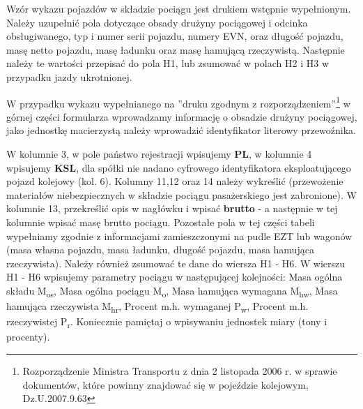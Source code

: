 Wzór wykazu pojazdów w składzie pociągu jest drukiem wstępnie wypełnionym. Należy uzupełnić pola dotyczące obsady drużyny pociągowej i odcinka obsługiwanego, typ i numer serii pojazdu, numery EVN, oraz długość pojazdu, masę netto pojazdu, masę ładunku oraz masę hamującą rzeczywistą. Następnie należy te wartości przepisać do pola H1, lub zsumować w polach H2 i H3 w przypadku jazdy ukrotnionej.

W przypadku wykazu wypełnianego na ''druku zgodnym z rozporządzeniem''\footnote{Rozporządzenie Ministra Transportu z dnia 2 listopada 2006 r. w sprawie dokumentów, które powinny znajdować się w pojeździe kolejowym, Dz.U.2007.9.63} w górnej części formularza wprowadzamy informację o obsadzie drużyny pociągowej, jako jednostkę macierzystą należy wprowadzić identyfikator literowy przewoźnika.

W kolumnie 3, w pole państwo rejestracji wpisujemy \textbf{PL}, w kolumnie 4 wpisujemy \textbf{KSL}, dla spółki nie nadano cyfrowego identyfikatora eksploatującego pojazd kolejowy (kol. 6). Kolumny 11,12 oraz 14 należy wykreślić (przewożenie materiałów niebezpiecznych w składzie pociągu pasażerskiego jest zabronione). W kolumnie 13, przekreślić opis w nagłówku i wpisać \textbf{brutto} - a następnie w tej kolumnie wpisać masę brutto pociągu. Pozostałe pola w tej części tabeli wypełniamy zgodnie z informacjami zamieszczonymi na pudle EZT lub wagonów (masa własna pojazdu, masa ładunku, długość pojazdu, masa hamująca rzeczywista). Należy również zsumować te dane do wiersza H1 - H6.
W wierszu H1 - H6 wpisujemy parametry pociągu w następującej kolejności: Masa ogólna składu M\textsubscript{os}, Masa ogólna pociągu M\textsubscript{o}, Masa hamująca wymagana M\textsubscript{hw}, Masa hamująca rzeczywista M\textsubscript{hr}, Procent m.h. wymaganej P\textsubscript{w}, Procent m.h. rzeczywistej P\textsubscript{r}. Koniecznie pamiętaj o wpisywaniu jednostek miary (tony i procenty).

